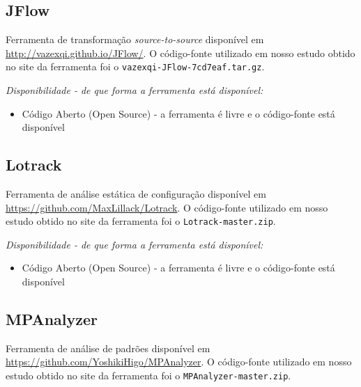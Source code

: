 \subsection{JFlow}

Ferramenta de transformação {\it source-to-source} disponível em
\url{http://vazexqi.github.io/JFlow/}. O código-fonte
utilizado em nosso estudo obtido no site da ferramenta foi o
\texttt{vazexqi-JFlow-7cd7eaf.tar.gz}.

\begin{description}

  \item {\it Disponibilidade - de que forma a ferramenta está disponível:}
    \begin{itemize}
      \item Código Aberto (Open Source) - a ferramenta é livre e o código-fonte está disponível
    \end{itemize}

\end{description}

\subsection{Lotrack}

Ferramenta de análise estática de configuração disponível em
\url{https://github.com/MaxLillack/Lotrack}. O código-fonte utilizado em nosso
estudo obtido no site da ferramenta foi o \texttt{Lotrack-master.zip}.

\begin{description}

  \item {\it Disponibilidade - de que forma a ferramenta está disponível:}
    \begin{itemize}
      \item Código Aberto (Open Source) - a ferramenta é livre e o código-fonte está disponível
    \end{itemize}

\end{description}

\subsection{MPAnalyzer}

Ferramenta de análise de padrões disponível em
\url{https://github.com/YoshikiHigo/MPAnalyzer}. O código-fonte utilizado em
nosso estudo obtido no site da ferramenta foi o \texttt{MPAnalyzer-master.zip}.

